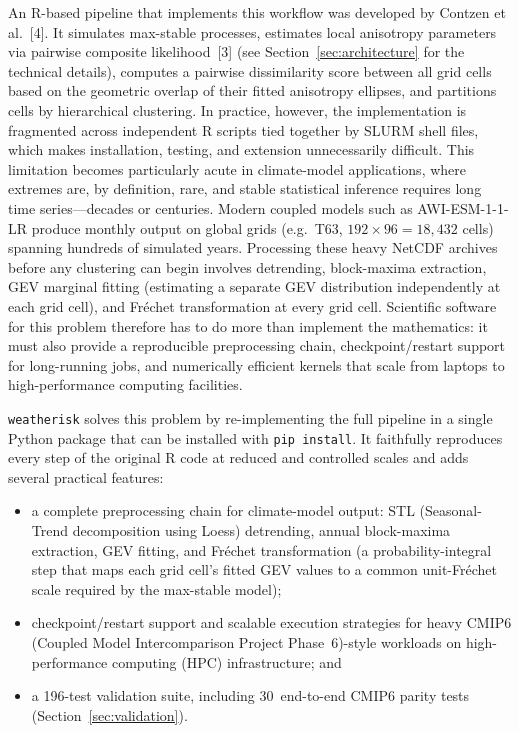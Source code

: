 \documentclass[preprint,12pt,a4paper]{elsarticle}
\newcommand{\rev}[1]{{#1}}
\newcommand{\revo}[1]{{#1}}
\newcommand{\revr}[1]{{#1}}
\begin{document}
An R-based pipeline that implements this workflow was developed
by Contzen et al.~[4]. It simulates max-stable processes,
estimates local anisotropy parameters via pairwise composite
likelihood~[3] \revr{(see Section~\ref{sec:architecture} for the
technical details)}, computes a pairwise dissimilarity score between
all grid cells based on the geometric overlap of their fitted
anisotropy ellipses, and partitions cells by hierarchical clustering. In practice,
however, the implementation is fragmented across independent
R scripts tied together by SLURM shell files, which makes
installation, testing, and extension unnecessarily difficult.
\rev{This limitation becomes particularly acute in climate-model
applications, where extremes are, by definition, rare, and stable
statistical inference requires long time series---decades or
centuries. Modern coupled models such as AWI-ESM-1-1-LR produce
monthly output on global grids (e.g.\ T63, $192 \times 96 = 18{,}432$ cells) spanning hundreds of simulated years.  Processing
these heavy NetCDF archives before any clustering can begin involves
detrending, block-maxima extraction, GEV marginal fitting (estimating
a separate GEV distribution independently at each grid cell), and
Fr\'{e}chet transformation at every grid cell.  Scientific software
for this problem therefore has to do more than implement the
mathematics: it must also provide a reproducible preprocessing chain,
checkpoint/restart support for long-running jobs, and numerically
efficient kernels that scale from laptops to high-performance
computing facilities.}

\texttt{weatherisk} solves this problem by re-implementing the full
pipeline in a single Python package that can be installed with
\texttt{pip install}.  It faithfully reproduces every step of the
original R code at reduced and controlled scales and adds several
practical features:
\begin{itemize}
\item \rev{a complete preprocessing chain for climate-model output:
  STL (Seasonal-Trend decomposition using Loess) detrending, annual
  block-maxima extraction, GEV fitting, and Fr\'{e}chet transformation
  (a probability-integral step that maps each grid cell's fitted GEV
  values to a common unit-Fr\'{e}chet scale required by the max-stable
  model)};
\item \rev{checkpoint/restart support and scalable execution
  strategies for heavy CMIP6\revo{ (Coupled Model Intercomparison
  Project Phase~6)}-style workloads on high-performance
  computing (HPC) infrastructure}; and
\item \rev{a 196-test validation suite, including 30~end-to-end
  CMIP6 parity tests (Section~\ref{sec:validation})}.
\end{itemize}
\end{document}
